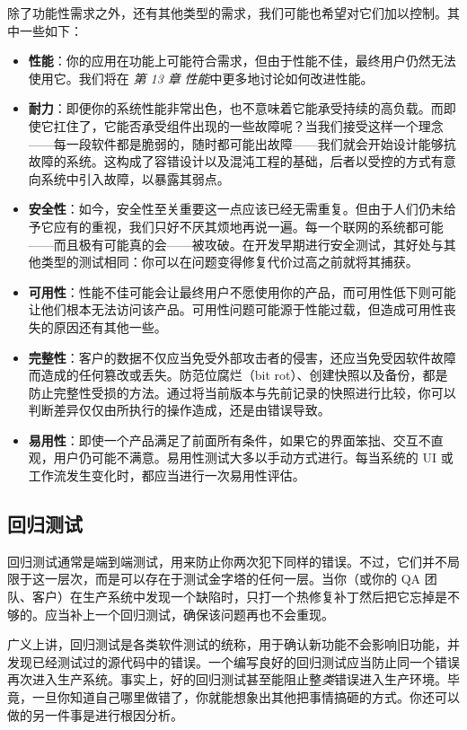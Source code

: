 \label{idx:793}
\label{idx:794}
除了功能性需求之外，还有其他类型的需求，我们可能也希望对它们加以控制。其中一些如下：

\begin{itemize}
\item \textbf{性能}：你的应用在功能上可能符合需求，但由于性能不佳，最终用户仍然无法使用它。我们将在 \emph{第 13 章} \emph{性能}中更多地讨论如何改进性能。
\item \textbf{耐力}：即便你的系统性能非常出色，也不意味着它能承受持续的高负载。而即使它扛住了，它能否承受组件出现的一些故障呢？当我们接受这样一个理念——每一段软件都是脆弱的，随时都可能出故障——我们就会开始设计能够抗故障的系统。这构成了容错设计以及混沌工程的基础，后者以受控的方式有意向系统中引入故障，以暴露其弱点。
\item \textbf{安全性}：如今，安全性至关重要这一点应该已经无需重复。但由于人们仍未给予它应有的重视，我们只好不厌其烦地再说一遍。每一个联网的系统都可能——而且极有可能真的会——被攻破。在开发早期进行安全测试，其好处与其他类型的测试相同：你可以在问题变得修复代价过高之前就将其捕获。
\item \textbf{可用性}：性能不佳可能会让最终用户不愿使用你的产品，而可用性低下则可能让他们根本无法访问该产品。可用性问题可能源于性能过载，但造成可用性丧失的原因还有其他一些。
\item \textbf{完整性}：客户的数据不仅应当免受外部攻击者的侵害，还应当免受因软件故障而造成的任何篡改或丢失。防范位腐烂（bit rot）、创建快照以及备份，都是防止完整性受损的方法。通过将当前版本与先前记录的快照进行比较，你可以判断差异仅仅由所执行的操作造成，还是由错误导致。
\label{idx:795}
\label{idx:796}
\item \textbf{易用性}：即使一个产品满足了前面所有条件，如果它的界面笨拙、交互不直观，用户仍可能不满意。易用性测试大多以手动方式进行。每当系统的 UI 或工作流发生变化时，都应当进行一次易用性评估。
\end{itemize}

\subsection{回归测试}

\label{idx:797}
\label{idx:798}
回归测试通常是端到端测试，用来防止你两次犯下同样的错误。不过，它们并不局限于这一层次，而是可以存在于测试金字塔的任何一层。当你（或你的 QA 团队、客户）在生产系统中发现一个缺陷时，只打一个热修复补丁然后把它忘掉是不够的。应当补上一个回归测试，确保该问题再也不会重现。

广义上讲，回归测试是各类软件测试的统称，用于确认新功能不会影响旧功能，并发现已经测试过的源代码中的错误。一个编写良好的回归测试应当防止同一个错误再次进入生产系统。事实上，好的回归测试甚至能阻止整\emph{类}错误进入生产环境。毕竟，一旦你知道自己哪里做错了，你就能想象出其他把事情搞砸的方式。你还可以做的另一件事是进行根因分析。

